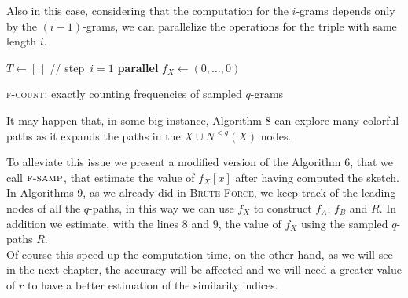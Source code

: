 Also in this case, considering that the computation for the $i$-grams depends only by the $(i-1)$-grams,
we can parallelize the operations for the triple with same length $i$.

\begin{algorithm}[h]

\small
\DontPrintSemicolon
{}
\BlankLine
$T\gets[\,]$ \quad // step~$i=1$\; 
\BlankLine
\textbf{parallel} 
\BlankLine
{}
\BlankLine
$f_X \gets (0,\ldots,0)$\;
\BlankLine
{}
\BlankLine
\caption{\textsc{f-count}: exactly counting frequencies of sampled $q$-grams}
\label{alg:frequency}
\end{algorithm}

\clearpage

It may happen that, in some big instance, Algorithm 8 
can explore many colorful paths as it expands the paths in the $X \cup N^{<q}(X)$ nodes.

To alleviate this issue we present a modified version of the Algorithm 6,
that we call $\textsc{f-samp}$, that estimate the value of $f_{X}[x]$ after having computed the sketch.\\

In Algorithms 9, as we already did in \textsc{Brute-Force}, we keep track of the leading nodes of all the $q$-paths, 
in this way we can use $f_{X}$ to construct $f_A$, $f_B$ and $R$. In addition we estimate, with the lines $8$ and $9$,
the value of $f_X$ using the sampled $q$-paths $R$.\\

Of course this speed up the computation time, 
on the other hand, as we will see in the next chapter, 
the accuracy will be affected and we will need a greater value of $r$ 
to have a better estimation of the similarity indices.

